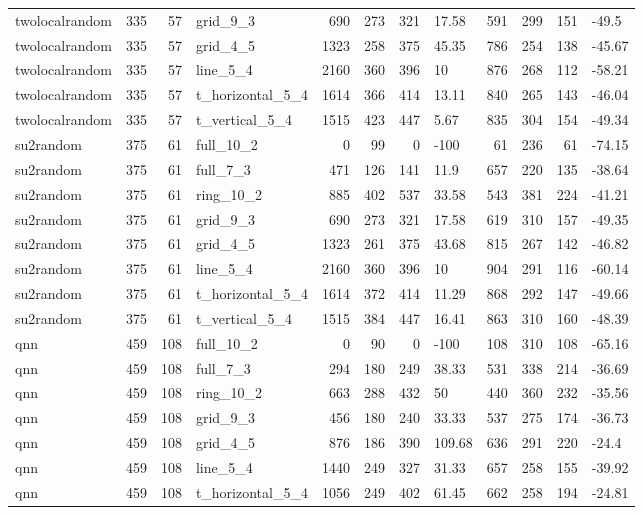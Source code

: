 \begin{longtable}{lrrlrrrlrrrl}
twolocalrandom & 335 & 57 & grid\_9\_3 & 690 & 273 & 321 & 17.58 & 591 & 299 & 151 & -49.5 \\
twolocalrandom & 335 & 57 & grid\_4\_5 & 1323 & 258 & 375 & 45.35 & 786 & 254 & 138 & -45.67 \\
twolocalrandom & 335 & 57 & line\_5\_4 & 2160 & 360 & 396 & 10 & 876 & 268 & 112 & -58.21 \\
twolocalrandom & 335 & 57 & t\_horizontal\_5\_4 & 1614 & 366 & 414 & 13.11 & 840 & 265 & 143 & -46.04 \\
twolocalrandom & 335 & 57 & t\_vertical\_5\_4 & 1515 & 423 & 447 & 5.67 & 835 & 304 & 154 & -49.34 \\
su2random & 375 & 61 & full\_10\_2 & 0 & 99 & 0 & -100 & 61 & 236 & 61 & -74.15 \\
su2random & 375 & 61 & full\_7\_3 & 471 & 126 & 141 & 11.9 & 657 & 220 & 135 & -38.64 \\
su2random & 375 & 61 & ring\_10\_2 & 885 & 402 & 537 & 33.58 & 543 & 381 & 224 & -41.21 \\
su2random & 375 & 61 & grid\_9\_3 & 690 & 273 & 321 & 17.58 & 619 & 310 & 157 & -49.35 \\
su2random & 375 & 61 & grid\_4\_5 & 1323 & 261 & 375 & 43.68 & 815 & 267 & 142 & -46.82 \\
su2random & 375 & 61 & line\_5\_4 & 2160 & 360 & 396 & 10 & 904 & 291 & 116 & -60.14 \\
su2random & 375 & 61 & t\_horizontal\_5\_4 & 1614 & 372 & 414 & 11.29 & 868 & 292 & 147 & -49.66 \\
su2random & 375 & 61 & t\_vertical\_5\_4 & 1515 & 384 & 447 & 16.41 & 863 & 310 & 160 & -48.39 \\
qnn & 459 & 108 & full\_10\_2 & 0 & 90 & 0 & -100 & 108 & 310 & 108 & -65.16 \\
qnn & 459 & 108 & full\_7\_3 & 294 & 180 & 249 & 38.33 & 531 & 338 & 214 & -36.69 \\
qnn & 459 & 108 & ring\_10\_2 & 663 & 288 & 432 & 50 & 440 & 360 & 232 & -35.56 \\
qnn & 459 & 108 & grid\_9\_3 & 456 & 180 & 240 & 33.33 & 537 & 275 & 174 & -36.73 \\
qnn & 459 & 108 & grid\_4\_5 & 876 & 186 & 390 & 109.68 & 636 & 291 & 220 & -24.4 \\
qnn & 459 & 108 & line\_5\_4 & 1440 & 249 & 327 & 31.33 & 657 & 258 & 155 & -39.92 \\
qnn & 459 & 108 & t\_horizontal\_5\_4 & 1056 & 249 & 402 & 61.45 & 662 & 258 & 194 & -24.81 \\

\end{longtable}
